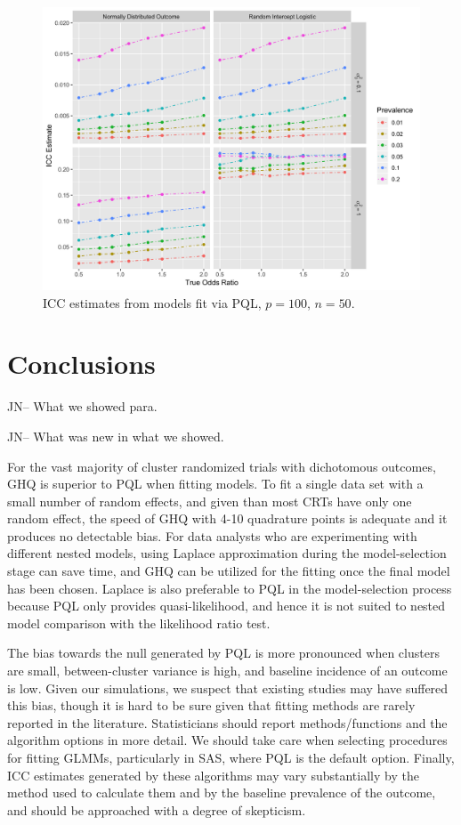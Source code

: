 \documentclass{article}
\begin{document}
\begin{flushleft}
\begin{figure}[]
\begin{center}
\includegraphics[width=12cm]{_icc_p100_n50.png}
  \caption{ICC estimates from models fit via PQL, $p=100$, $n=50$.}
    \label{fig:_icc}
\end{center}
\end{figure}


\section{Conclusions}

JN-- What we showed para.

JN-- What was new in what we showed.

For the vast majority of cluster randomized trials with dichotomous outcomes, GHQ is superior to PQL when fitting models. To fit a single data set with a small number of random effects, and given than most CRTs have only one random effect, the speed of GHQ with 4-10 quadrature points is adequate and it produces no detectable bias. For data analysts who are experimenting with different nested models, using Laplace approximation during the model-selection stage can save time, and GHQ can be utilized for the fitting once the final model has been chosen. Laplace is also preferable to PQL in the model-selection process because PQL only provides quasi-likelihood, and hence it is not suited to nested model comparison with the likelihood ratio test.

The bias towards the null generated by PQL is more pronounced when clusters are small, between-cluster variance is high, and baseline incidence of an outcome is low. Given our simulations, we suspect that existing studies may have suffered this bias, though it is hard to be sure given that fitting methods are rarely reported in the literature. Statisticians should report methods/functions and the algorithm options in more detail.  We should take care when selecting procedures for fitting GLMMs, particularly in SAS, where PQL is the default option. Finally, ICC estimates generated by these algorithms may vary substantially by the method used to calculate them and by the baseline prevalence of the outcome, and should be approached with a degree of skepticism.


\end{flushleft}
\end{document}
